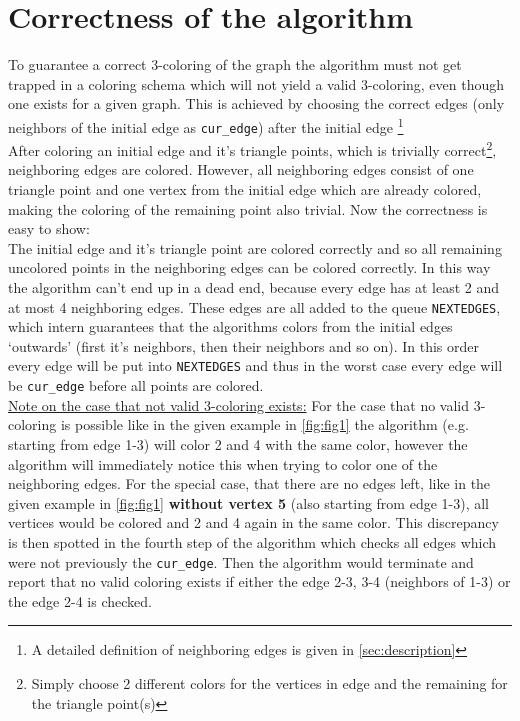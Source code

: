 \documentclass[english]{scrartcl}
\newcommand{\code}{\texttt}
\begin{document}
\section{Correctness of the algorithm}
\label{sec:correctness}
To guarantee a correct 3-coloring of the graph the algorithm must not get trapped in a coloring schema which will not yield a valid 3-coloring, even though one exists for a given graph. This is achieved by choosing the correct edges (only neighbors of the initial edge as \code{cur\_edge}) after the initial edge \footnote{A detailed definition of neighboring edges is given in \autoref{sec:description} } \\After coloring an initial edge and it's triangle points, which is trivially correct\footnote{Simply choose 2 different colors for the vertices in edge and the remaining for the triangle point(s)}, neighboring edges are colored. However, all neighboring edges consist of one triangle point  and one vertex from the initial edge which are already colored, making the coloring of the remaining point also trivial. Now the correctness is easy to show:\\ The initial edge and it's triangle point are colored correctly and so all remaining uncolored points in the neighboring edges can be colored correctly. In this way the algorithm can't end up in a dead end, because every edge has at least 2 and at most 4 neighboring edges. These edges are all added to the queue \code{NEXTEDGES}, which intern guarantees that the algorithms colors from the initial edges \enquote*{outwards} (first it's neighbors, then their neighbors and so on). In this order every edge will be put into \code{NEXTEDGES} and thus in the worst case every edge will be \code{cur\_edge} before all points are colored. \\
\underline{Note on the case that not valid 3-coloring exists:} For the case that no valid 3-coloring is possible like in the given example in \autoref{fig:fig1} the algorithm (e.g. starting from edge 1-3) will color 2 and 4 with the same color, however the algorithm will immediately notice this when trying to color one of the neighboring edges. For the special case, that there are no edges left, like in the given example in \autoref{fig:fig1} \textbf{without vertex 5} (also starting from edge 1-3), all vertices would be colored and 2 and 4 again in the same color. This discrepancy is then spotted in the fourth step of the algorithm which checks all edges which were not previously the \code{cur\_edge}. Then the algorithm would terminate and report that no valid coloring exists if either the edge 2-3, 3-4 (neighbors of 1-3) or the edge 2-4 is checked.
 




\clearpage


\end{document}
